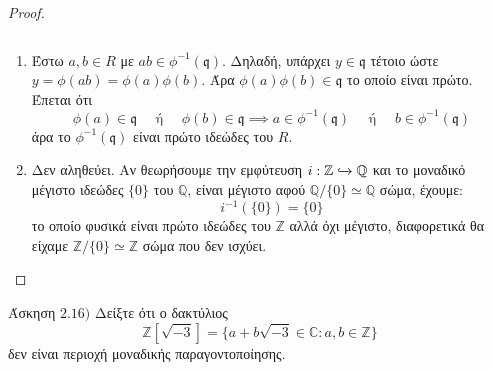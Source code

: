 \documentclass[oneside,a4paper]{article}
\newcommand{\Z}{\mathbb{Z}}
\newcommand{\Q}{\mathbb{Q}}
\begin{document}
\begin{proof} $ $

	$ $\newline
	\begin{enumerate}
		\item Έστω $a,b \in R$ με $ab \in \phi^{-1} (\mathfrak{q})$. Δηλαδή, υπάρχει $y \in \mathfrak{q}$ τέτοιο ώστε $y = \phi (ab) = \phi(a) \phi(b)$. Άρα $\phi(a) \phi(b) \in \mathfrak{q}$ το οποίο είναι πρώτο. Έπεται ότι
		$$\phi(a) \in \mathfrak{q} \quad \text{ ή }\quad \phi(b) \in \mathfrak{q} \implies a \in \phi^{-1} (\mathfrak{q}) \quad\text{ ή }\quad b \in \phi^{-1} (\mathfrak{q})$$
		άρα το $\phi^{-1} (\mathfrak{q})$ είναι πρώτο ιδεώδες του $R$.

		\item Δεν αληθεύει. Αν θεωρήσουμε την εμφύτευση $i: \mathbb{Z} \xhookrightarrow{} \mathbb{Q}$ και το μοναδικό μέγιστο ιδεώδες $\{0\}$ του $\Q$, είναι μέγιστο αφού $\Q / \{0\} \simeq \Q$ σώμα, έχουμε:
		$$i^{-1} ( \{0\} ) = \{0\}$$
		το οποίο φυσικά είναι πρώτο ιδεώδες του $\mathbb{Z}$ αλλά όχι μέγιστο, διαφορετικά θα είχαμε $\mathbb{Z}/\{0\} \simeq \mathbb{Z}$ σώμα που δεν ισχύει.
	\end{enumerate}
\end{proof}
\pagebreak

\noindent Άσκηση $2.16)$
\quad Δείξτε ότι ο δακτύλιος
$$\Z [\sqrt{-3}] = \{a + b\sqrt{-3} \in \mathbb{C}: a,b\in \Z \}$$
δεν είναι περιοχή μοναδικής παραγοντοποίησης.
\end{document}
